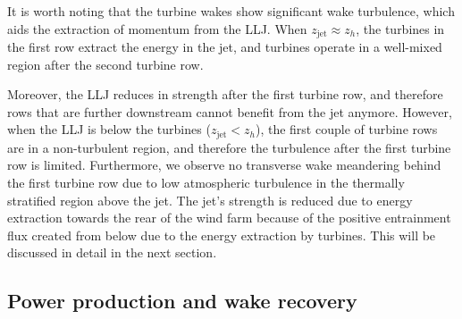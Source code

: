 \documentclass[%
 aip,
 amsmath,amssymb,
reprint,
twocolumn,%
author-numerical,%
]{revtex4-1}
\begin{document}
It is worth noting that the turbine wakes show significant wake turbulence, which aids the extraction of momentum from the LLJ. When $z_\text{jet} \approx z_h$, the turbines in the first row extract the energy in the jet, and turbines operate in a well-mixed region after the second turbine row. {{\color{black} Moreover, the LLJ reduces in strength after the first turbine row, and therefore rows that are further downstream cannot benefit from the jet anymore.} However, when the LLJ is below the turbines ($z_\text{jet} < z_h$), the first couple of turbine rows are in a non-turbulent region, and therefore the turbulence after the first turbine row is limited. Furthermore, we observe no transverse wake meandering behind the first turbine row due to low atmospheric turbulence in the thermally stratified region above the jet. The jet's strength is reduced due to energy extraction towards the rear of the wind farm because of the positive entrainment flux created from below due to the energy extraction by turbines. This will be discussed in detail in the next section.

\subsection{Power production and wake recovery}\label{sec3.2}

}
\end{document}
